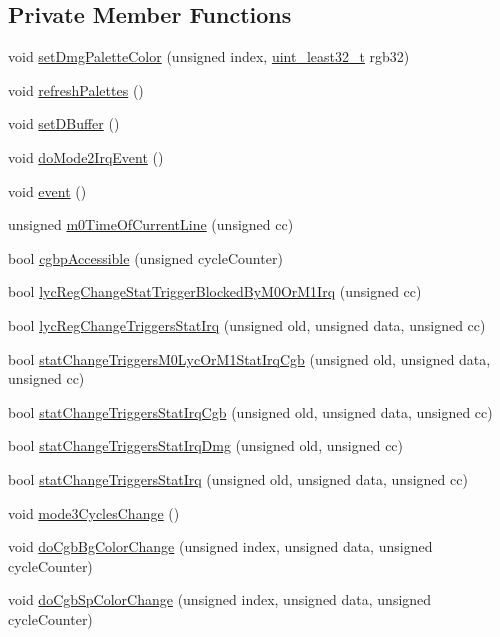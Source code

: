 \subsection*{Private Member Functions}
\begin{DoxyCompactItemize}
\item 
void \hyperlink{classgambatte_1_1LCD_a23e9de1967943c4eed5333cede536126}{set\+Dmg\+Palette\+Color} (unsigned index, \hyperlink{namespacegambatte_a0639f09fccfbbd5a8e0796318768e370}{uint\+\_\+least32\+\_\+t} rgb32)
\item 
void \hyperlink{classgambatte_1_1LCD_ae817caaa14358539b2a72df56af221d3}{refresh\+Palettes} ()
\item 
void \hyperlink{classgambatte_1_1LCD_ae5c61529e58c19d39ba733be1872ff08}{set\+D\+Buffer} ()
\item 
void \hyperlink{classgambatte_1_1LCD_a5302f917f27bf309e8b97c58b8650560}{do\+Mode2\+Irq\+Event} ()
\item 
void \hyperlink{classgambatte_1_1LCD_ad03eaa25f4fe80cdcf7a8ad2dc5041fc}{event} ()
\item 
unsigned \hyperlink{classgambatte_1_1LCD_ad69451f6090c45c7267cbef0170bd88d}{m0\+Time\+Of\+Current\+Line} (unsigned cc)
\item 
bool \hyperlink{classgambatte_1_1LCD_a7cea49c5aa2b2c1bec6e512900d20874}{cgbp\+Accessible} (unsigned cycle\+Counter)
\item 
bool \hyperlink{classgambatte_1_1LCD_a97b1b0073789fba4a4ac2da4e6974fc2}{lyc\+Reg\+Change\+Stat\+Trigger\+Blocked\+By\+M0\+Or\+M1\+Irq} (unsigned cc)
\item 
bool \hyperlink{classgambatte_1_1LCD_ac77922485b06c2d388048bad70552af3}{lyc\+Reg\+Change\+Triggers\+Stat\+Irq} (unsigned old, unsigned data, unsigned cc)
\item 
bool \hyperlink{classgambatte_1_1LCD_abf83e8f6ccb1f9f38752b692112b253e}{stat\+Change\+Triggers\+M0\+Lyc\+Or\+M1\+Stat\+Irq\+Cgb} (unsigned old, unsigned data, unsigned cc)
\item 
bool \hyperlink{classgambatte_1_1LCD_a45efb90e1520d0cf43f8f49b9890b4f1}{stat\+Change\+Triggers\+Stat\+Irq\+Cgb} (unsigned old, unsigned data, unsigned cc)
\item 
bool \hyperlink{classgambatte_1_1LCD_affafcdc54fc073a21b20a04eab7c3531}{stat\+Change\+Triggers\+Stat\+Irq\+Dmg} (unsigned old, unsigned cc)
\item 
bool \hyperlink{classgambatte_1_1LCD_a6aca109bc8b45f097a799361d65e6964}{stat\+Change\+Triggers\+Stat\+Irq} (unsigned old, unsigned data, unsigned cc)
\item 
void \hyperlink{classgambatte_1_1LCD_a8fbf8553dd5adc945c09bc7f34cbad90}{mode3\+Cycles\+Change} ()
\item 
void \hyperlink{classgambatte_1_1LCD_a0cc9f0c0725e4c41d5e5ce9d469834f6}{do\+Cgb\+Bg\+Color\+Change} (unsigned index, unsigned data, unsigned cycle\+Counter)
\item 
void \hyperlink{classgambatte_1_1LCD_af50eb0c94357f902f2141e9ca3bba2ba}{do\+Cgb\+Sp\+Color\+Change} (unsigned index, unsigned data, unsigned cycle\+Counter)
\end{DoxyCompactItemize}
